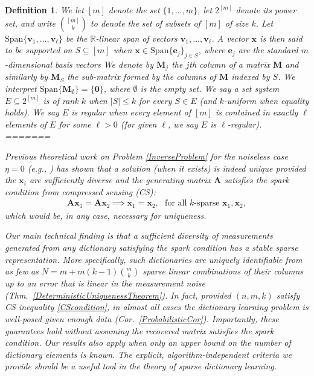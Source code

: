 \documentclass[9pt,twocolumn]{pnas-new}
\newtheorem{definition}{Definition}
\begin{document}
\begin{definition}
We let $[m]$ denote the set $\{1, \ldots, m\}$, let $2^{[m]}$ denote its power set, and write ${[m] \choose k}$ to denote the set of subsets of $[m]$ of size $k$. Let $\text{Span}\{\mathbf{v}_1, \ldots, \mathbf{v}_\ell\}$ be the $\mathbb{R}$-linear span of vectors $\mathbf{v}_1, \ldots, \mathbf{v}_\ell$. A vector $\mathbf{x}$ is then said to be \emph{supported} on $S \subseteq [m]$ when $\mathbf{x} \in \text{Span} \{\mathbf{e}_j\}_{j\in S}$, where $\mathbf{e}_j$ are the standard $m$-dimensional basis vectors We denote by $\mathbf{M}_j$ the $j$th column of a matrix $\mathbf{M}$ and similarly by $\mathbf{M}_S$ the sub-matrix formed by the columns of $\mathbf{M}$ indexed by $S$. We interpret $\text{Span}\{\mathbf{M}_\emptyset\} = \{\textbf{0}\}$, where $\emptyset$ is the empty set. We say a set system $E \subseteq 2^{[m]}$ is of rank $k$ when $|S| \leq k$ for every $S \in E$ (and $k$-uniform when equality holds). We say $E$ is \emph{regular} when every element of $[m]$ is contained in exactly $\ell$ elements of $E$ for some $\ell > 0$ (for given $\ell$, we say $E$ is $\ell$-regular).
=======



Previous theoretical work on Problem \ref{InverseProblem} for the noiseless case $\eta =0$ (e.g., \cite{li2004analysis, Georgiev05, Aharon06, Hillar15}) has shown that a solution (when it exists) is indeed unique provided the $\mathbf{x}_i$ are sufficiently diverse and the generating matrix $\mathbf{A}$ satisfies the \textit{spark condition} from compressed sensing (CS):
\begin{align}\label{SparkCondition}
\mathbf{A}\mathbf{x}_1 = \mathbf{A}\mathbf{x}_2 \implies \mathbf{x}_1 = \mathbf{x}_2, \ \ \ \text{for all $k$-sparse } \mathbf{x}_1, \mathbf{x}_2,
\end{align}
%
which would be, in any case, necessary for uniqueness.

Our main technical finding is that a sufficient diversity of measurements generated from any dictionary satisfying the spark condition 
has a stable sparse representation.  More specifically, such dictionaries are uniquely identifiable from as few as \mbox{$N = m + m(k-1){m \choose k}$} sparse linear combinations of their columns up to an error that is linear in the measurement noise (Thm.~\ref{DeterministicUniquenessTheorem}). In fact, provided $(n, m, k)$ satisfy CS inequality \eqref{CScondition}, in almost all cases the dictionary learning problem is well-posed given enough data (Cor.~\ref{ProbabilisticCor}). Importantly, these guarantees hold without assuming the recovered matrix satisfies the spark condition. Our results  also apply when only an upper bound on the number of dictionary elements is known. The explicit, algorithm-independent criteria we provide should be a useful tool in the theory of sparse dictionary learning.  %


\end{definition}
\end{document}
